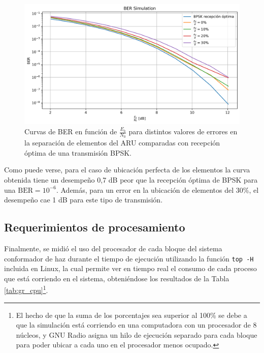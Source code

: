 \begin{figure}
    \centering
    \includegraphics[width=0.9\linewidth]{images/07-GNURadio/gr_bersim_resul.png}
    \caption{Curvas de BER en función de $\frac{E_b}{N_0}$ para distintos valores de errores en la separación de elementos del ARU comparadas con recepción óptima de una transmisión BPSK.}
    \label{fig:gr_bersim_resul}
\end{figure}

Como puede verse, para el caso de ubicación perfecta de los elementos la curva obtenida tiene un desempeño 0,7 dB peor que la recepción óptima de BPSK para una $\textrm{BER}=10^{-6}$. Además, para un error en la ubicación de elementos del 30\%, el desempeño cae 1 dB para este tipo de transmisión.

\subsection{Requerimientos de procesamiento}\label{subc:gr_proc}

Finalmente, se midió el uso del procesador de cada bloque del sistema conformador de haz durante el tiempo de ejecución utilizando la función \texttt{top -H} incluida en Linux, la cual permite ver en tiempo real el consumo de cada proceso que está corriendo en el sistema, obteniéndose los resultados de la Tabla \ref{tab:gr_cpu}\footnote{El hecho de que la suma de los porcentajes sea superior al 100\% se debe a que la simulación está corriendo en una computadora con un procesador de 8 núcleos, y GNU Radio asigna un hilo de ejecución separado para cada bloque para poder ubicar a cada uno en el procesador menos ocupado.}.


